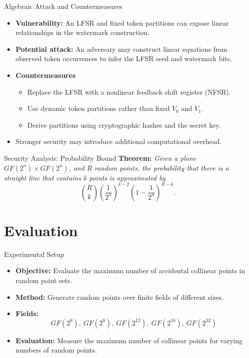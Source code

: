 \documentclass[xcolor=dvipsnames,aspectratio=169]{beamer}
\begin{document}
	\begin{frame}{Algebraic Attack and Countermeasures}
		\begin{itemize}
			\item \textbf{Vulnerability:}
			An LFSR and fixed token partitions can expose linear relationships in the watermark construction.
			\item \textbf{Potential attack:}
			An adversary may construct linear equations from observed token occurrences to infer the LFSR seed and watermark bits.
			\item \textbf{Countermeasures}
			\begin{itemize}
				\item Replace the LFSR with a nonlinear feedback shift register (NFSR).
				\item Use dynamic token partitions rather than fixed $V_0$ and $V_1$.
				\item Derive partitions using cryptographic hashes and the secret key.
			\end{itemize}
			\item Stronger security may introduce additional computational overhead.
		\end{itemize}
	\end{frame}
	
	\begin{frame}{Security Analysis: Probability Bound}
		\textbf{Theorem:} \textit{Given a plane $GF(2^n)\times GF(2^n)$, and $R$ random points, the probability that there is a straight line that contains k points is approximated by}
		\vspace{0.5cm}
		\[
		\binom{R}{k}
		\left(\frac{1}{2^n}\right)^{k-2}
		\left(1-\frac{1}{2^n}\right)^{R-k}.
		\]
	\end{frame}
	
	\section{Evaluation}
	\begin{frame}{Experimental Setup}
		\begin{itemize}
			\item \textbf{Objective:} Evaluate the maximum number of accidental collinear points in random point sets.
			\item \textbf{Method:} Generate random points over finite fields of different sizes.
			\item \textbf{Fields:}
			\[
			GF(2^6),\ GF(2^8),\ GF(2^{12}),\
			GF(2^{16}),\ GF(2^{32})
			\]
			\item \textbf{Evaluation:} Measure the maximum number
			of collinear points for varying numbers of random points.
		\end{itemize}
	\end{frame}
	
\end{document}
